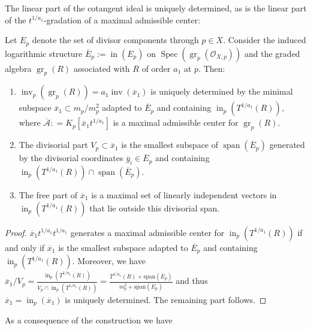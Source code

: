 \documentclass{amsart}
\newcommand{\cA}{{\mathcal A}}
\newcommand{\spa}{{\operatorname{span}}}
\newcommand{\inn}{\operatorname{in}}
\newcommand{\Spec}{\operatorname{Spec}}
\newcommand{\gr}{{\operatorname{gr}}}
\newcommand{\inv}{{\operatorname{inv}}}
\begin{document}
The linear part of the cotangent ideal is uniquely determined, as is the linear part of the $t^{1/a_1}$-gradation of  a maximal admissible center:
\begin{lemma} \label{max}
Let $E_p$ denote the set of divisor components through $p \in X$. Consider the induced logarithmic structure $\overline E_p := \inn(E_p)$ on $\Spec(\gr_p(\mathcal O_{X,p}))$ and  the graded algebra $\gr_p(R)$ associated with $R$ of order  $a_1$ at $p$. Then:
\begin{enumerate}
	\item	$\inv_p(\gr_p(R)) = a_1\inv(\overline{x}_1)$ is uniquely determined by the minimal subspace $\overline{x}_1 \subset m_p / m_p^2$ adapted to $\overline E_p$ and containing $\inn_p(T^{1/a_1}(R))$, where $\overline{\cA}: =K_p[\overline{x}_1t^{1/a_1}]$ is a maximal admissible center for $\gr_p(R)$.
	\item The divisorial part $V_p \subset \overline{x}_1$ is the smallest subspace of $\spa(\overline E_p)$ generated by the divisorial coordinates $\overline y_i \in \overline E_p$ and containing $\inn_p(T^{1/a_1}(R)) \cap \spa(\overline E_p)$.
	\item	The free part of $\overline{x}_1$ is a maximal set of linearly independent vectors in $\inn_p(T^{1/a_1}(R))$ that lie outside this divisorial span.
	\end{enumerate}
\end{lemma}

\begin{proof}   $\overline{x}_1t^{1/a_1}t^{1/a_1}$  generates  a maximal admissible center for $\inn_p(T^{1/a_1}(R))$ 
if and only if  $\overline{x}_1$ is the smallest subspace adapted to $\overline{E}_p$ and containing $\inn_p(T^{1/a_1}(R))$. 
Moreover, we have
$
{\overline{x}_1}/{V_p} 
= \frac{\inn_p\left(T^{1/a_1}(R)\right)}{V_p \cap \inn_p\left(T^{1/a_1}(R)\right)} 
= \frac{T^{1/a_1}(R) + \mathrm{span}(E_p)}{m_p^2 + \mathrm{span}(\overline{E}_p)}
$ and thus \\${\overline{x}_1}=\inn_p(\overline{x}_1)$ is uniquely determined. The remaining part follows.
\end{proof}

As a consequence of the construction we have
\end{document}
